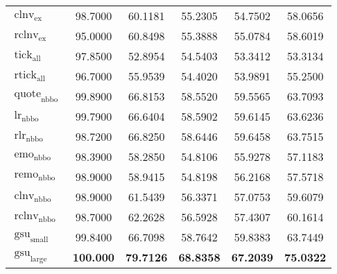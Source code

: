 \begin{table}
\begin{tabular}{@{}lSSSSS@{}}
        $\operatorname{clnv}_{\mathrm{ex}}$    & 98.7000           & 60.1181                            & 55.2305           & 54.7502           & 58.0656           \\
        $\operatorname{rclnv}_{\mathrm{ex}}$   & 95.0000           & 60.8498                            & 55.3888           & 55.0784           & 58.6019           \\ \midrule
        $\operatorname{tick}_{\mathrm{all}}$   & 97.8500           & 52.8954                            & 54.5403           & 53.3412           & 53.3134           \\
        $\operatorname{rtick}_{\mathrm{all}}$  & 96.7000           & 55.9539                            & 54.4020           & 53.9891           & 55.2500           \\ \midrule
        $\operatorname{quote}_{\mathrm{nbbo}}$ & 99.8900           & 66.8153                            & 58.5520           & 59.5565           & 63.7093           \\
        $\operatorname{lr}_{\mathrm{nbbo}}$    & 99.7900           & 66.6404                            & 58.5902           & 59.6145           & 63.6236           \\
        $\operatorname{rlr}_{\mathrm{nbbo}}$   & 98.7200           & 66.8250                            & 58.6446           & 59.6458           & 63.7515           \\
        $\operatorname{emo}_{\mathrm{nbbo}}$   & 98.3900           & 58.2850                            & 54.8106           & 55.9278           & 57.1183           \\
        $\operatorname{remo}_{\mathrm{nbbo}}$  & 98.9000           & 58.9415                            & 54.8198           & 56.2168           & 57.5718           \\
        $\operatorname{clnv}_{\mathrm{nbbo}}$  & 98.9000           & 61.5439                            & 56.3371           & 57.0753           & 59.6079           \\
        $\operatorname{rclnv}_{\mathrm{nbbo}}$ & 98.7000           & 62.2628                            & 56.5928           & 57.4307           & 60.1614           \\ \midrule
        $\operatorname{gsu}_{\mathrm{small}}$  & 99.8400           & 66.7098                            & 58.7642           & 59.8383           & 63.7449           \\
        $\operatorname{gsu}_{\mathrm{large}}$  & \bfseries 100.000 & \bfseries 79.7126                  & \bfseries 68.8358 & \bfseries 67.2039 & \bfseries 75.0322 \\
        \bottomrule
    \end{tabular}
\end{table}

